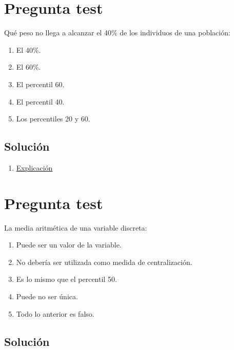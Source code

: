 \documentclass[
]{book}
\providecommand{\tightlist}{%
  \setlength{\itemsep}{0pt}\setlength{\parskip}{0pt}}
\begin{document}
\hypertarget{pregunta-test-36}{%
\section{Pregunta test}\label{pregunta-test-36}}

Qué peso no llega a alcanzar el 40\% de los individuos de una población:

\begin{enumerate}
\def\labelenumi{\alph{enumi})}
\tightlist
\item
  El 40\%.
\item
  El 60\%.
\item
  El percentil 60.
\item
  El percentil 40.
\item
  Los percentiles 20 y 60.
\end{enumerate}

\hypertarget{soluciuxf3n-38}{%
\subsection{Solución}\label{soluciuxf3n-38}}

\begin{enumerate}
\def\labelenumi{\alph{enumi})}
\setcounter{enumi}{3}
\tightlist
\item
  \href{https://1fjmanzano.github.io/bioestadistica/medidas-de-posicio\%CC\%81n-dispersio\%CC\%81n-y-forma.html\#medidas-de-posicio\%CC\%81n-no-centrales}{Explicación}
\end{enumerate}

\hypertarget{pregunta-test-37}{%
\section{Pregunta test}\label{pregunta-test-37}}

La media aritmética de una variable discreta:

\begin{enumerate}
\def\labelenumi{\alph{enumi})}
\tightlist
\item
  Puede ser un valor de la variable.
\item
  No debería ser utilizada como medida de centralización.
\item
  Es lo mismo que el percentil 50.
\item
  Puede no ser única.
\item
  Todo lo anterior es falso.
\end{enumerate}

\hypertarget{soluciuxf3n-39}{%
\subsection{Solución}\label{soluciuxf3n-39}}
\end{document}
